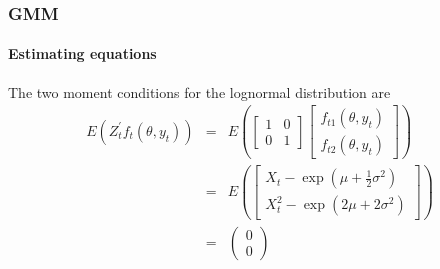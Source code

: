 \documentclass{beamer}
\begin{document}
\begin{frame}\frametitle{GMM}\framesubtitle{Estimating equations}
\begin{example}
    The two moment conditions for the lognormal distribution are
    \begin{eqnarray*}
    E\left( Z_{t}^{\prime }f_{t}\left( \theta ,y_{t}\right) \right) &=&E\left(
    \left[
    \begin{array}{ll}
    1 & 0 \\
    0 & 1%
    \end{array}
    \right] \left[
    \begin{array}{c}
    f_{t1}\left( \theta ,y_{t}\right) \\
    f_{t2}\left( \theta ,y_{t}\right)
    \end{array}
    \right] \right) \\
    &=&E\left( \left[
    \begin{array}{c}
    X_{t}-\exp \left( \mu +\frac{1}{2}\sigma ^{2}\right) \\
    X_{t}^{2}-\exp \left( 2\mu +2\sigma ^{2}\right)
    \end{array}
    \right] \right) \\
    &=&\left(
    \begin{array}{c}
    0 \\
    0
    \end{array}
    \right)
    \end{eqnarray*}
\end{example}
\end{frame}
\end{document}
